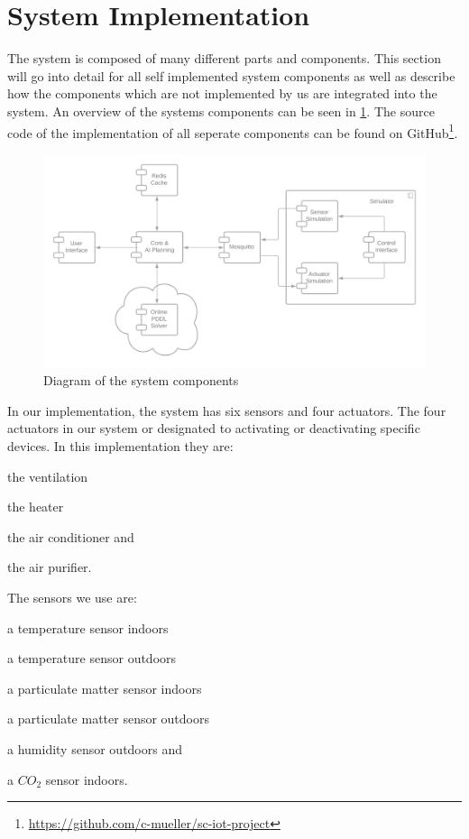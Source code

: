 \section{System Implementation}

The system is composed of many different parts and components. 
This section will go into detail for all self implemented system components as well as describe how the components which are not implemented by us are integrated into the system.
An overview of the systems components can be seen in \cref{fig:implementation-architecture}.
The source code of the implementation of all seperate components can be found on GitHub\footnote{\url{https://github.com/c-mueller/sc-iot-project}}.

\begin{figure}
    \centering
    \includegraphics[width=\linewidth]{img/implementation-architecture.png}
    \caption{Diagram of the system components}
    \label{fig:implementation-architecture}
\end{figure}

In our implementation, the system has six sensors and four actuators. The four actuators in our system or designated to activating or deactivating specific devices. In this implementation they are: 
\begin{inparaenum}[1)]
    \item the ventilation
    \item the heater
    \item the air conditioner and
    \item the air purifier.
\end{inparaenum}
The sensors we use are: 
\begin{inparaenum}[1)]
    \item a temperature sensor indoors
    \item a temperature sensor outdoors
    \item a particulate matter sensor indoors
    \item a particulate matter sensor outdoors
    \item a humidity sensor outdoors and
    \item a $CO_2$ sensor indoors.
\end{inparaenum}

%





